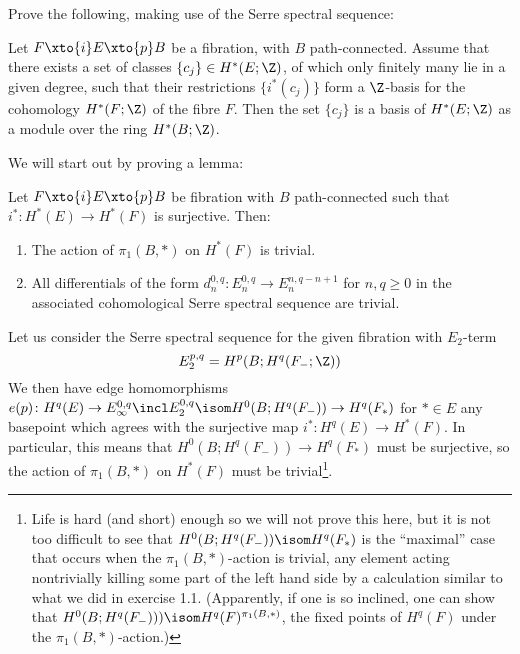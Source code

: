 \begin{exercise}
	Prove the following, making use of the Serre spectral sequence:
	\begin{theorem}
		Let $F \xto{i} E \xto{p} B$ be a fibration, with $B$ path-connected.
		Assume that there exists a set of classes $\{c_j\} \in H^*(E; \Z)$, of which only finitely many lie in a given degree, such that their restrictions $\{i^*(c_j)\}$ form a $\Z$-basis for the cohomology $H^*(F; \Z)$ of the fibre $F$.
		Then the set $\{c_j\}$ is a basis of $H^*(E; \Z)$ as a module over the ring $H^*(B; \Z)$.
	\end{theorem}
\end{exercise}
\begin{solution}
	We will start out by proving a lemma:
	\begin{lemma}
		Let $F \xto{i} E \xto{p} B$ be fibration with $B$ path-connected such that $i^*\colon H^*(E) \to H^*(F)$ is surjective.
		Then:
		\begin{enumerate}
			\item The action of $\pi_1(B, *)$ on $H^*(F)$ is trivial.
			\item All differentials of the form $d_n^{0, q}\colon E_n^{0, q} \to E_n^{n, q - n + 1}$ for $n, q \geq 0$ in the associated cohomological Serre spectral sequence are trivial.
		\end{enumerate}
	\end{lemma}
	\begin{smallproof}
		Let us consider the Serre spectral sequence for the given fibration with $E_2$-term
		\begin{equation*}
			E_2^{p, q} = H^p(B; H^q(F_{-}; \Z))
		\end{equation*}
		We then have edge homomorphisms $e(p)\colon H^q(E) \to E_\infty^{0, q} \incl E_2^{0, q} \isom H^0(B; H^q(F_{-})) \to H^q(F_*)$ for $* \in E$ any basepoint which agrees with the surjective map $i^*\colon H^q(E) \to H^*(F)$.
		In particular, this means that $H^0(B; H^q(F_{-})) \to H^q(F_*)$ must be surjective, so the action of $\pi_1(B, *)$ on $H^*(F)$ must be trivial\footnote{Life is hard (and short) enough so we will not prove this here, but it is not too difficult to see that $H^0(B; H^q(F_{-})) \isom H^q(F_*)$ is the \enquote{maximal} case that occurs when the $\pi_1(B, *)$-action is trivial, any element acting nontrivially killing some part of the left hand side by a calculation similar to what we did in exercise 1.1. (Apparently, if one is so inclined, one can show that $H^0(B; H^q(F_{-}))) \isom H^q(F)^{\pi_1(B, *)}$, the fixed points of $H^q(F)$ under the $\pi_1(B, *)$-action.)}.
		

\end{smallproof}
\end{solution}
